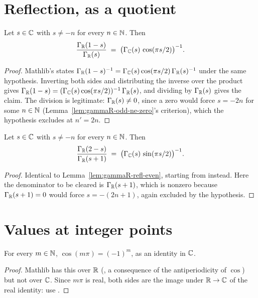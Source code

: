 \section{Reflection, as a quotient}
\label{sec:gamma-reflection}

\begin{lemma}
  \label{lem:gammaR-refl-even}
  \leanok
  Let $s \in \mathbb{C}$ with $s \neq -n$ for every $n \in \mathbb{N}$. Then
  \[ \frac{\Gamma_{\mathbb{R}}(1-s)}{\Gamma_{\mathbb{R}}(s)} \;=\;
     \bigl(\Gamma_{\mathbb{C}}(s)\,\cos(\pi s/2)\bigr)^{-1}. \]
\end{lemma}
\begin{proof}
  \leanok
  Mathlib's  states
  $\Gamma_{\mathbb{R}}(1-s)^{-1} = \Gamma_{\mathbb{C}}(s)\cos(\pi s/2)\,\Gamma_{\mathbb{R}}(s)^{-1}$ under the same
  hypothesis. Inverting both sides and distributing the inverse over the product gives
  $\Gamma_{\mathbb{R}}(1-s) = (\Gamma_{\mathbb{C}}(s)\cos(\pi s/2))^{-1}\,\Gamma_{\mathbb{R}}(s)$, and dividing by
  $\Gamma_{\mathbb{R}}(s)$ gives the claim. The division is legitimate:
  $\Gamma_{\mathbb{R}}(s) \neq 0$, since a zero would force $s = -2n$ for some $n \in \mathbb{N}$
  (Lemma~\ref{lem:gammaR-odd-ne-zero}'s criterion), which the hypothesis excludes at $n' = 2n$.
\end{proof}

\begin{lemma}
  \label{lem:gammaR-refl-odd}
  \leanok
  Let $s \in \mathbb{C}$ with $s \neq -n$ for every $n \in \mathbb{N}$. Then
  \[ \frac{\Gamma_{\mathbb{R}}(2-s)}{\Gamma_{\mathbb{R}}(s+1)} \;=\;
     \bigl(\Gamma_{\mathbb{C}}(s)\,\sin(\pi s/2)\bigr)^{-1}. \]
\end{lemma}
\begin{proof}
  \leanok
  Identical to Lemma~\ref{lem:gammaR-refl-even}, starting from
   instead. Here the denominator to be cleared is
  $\Gamma_{\mathbb{R}}(s+1)$, which is nonzero because $\Gamma_{\mathbb{R}}(s+1) = 0$ would force
  $s = -(2n+1)$, again excluded by the hypothesis.
\end{proof}

\section{Values at integer points}
\label{sec:gamma-values}

\begin{lemma}
  \label{lem:cos-natCast-mul-pi}
  \leanok
  For every $m \in \mathbb{N}$, $\cos(m\pi) = (-1)^{m}$, as an identity in $\mathbb{C}$.
\end{lemma}
\begin{proof}
  \leanok
  Mathlib has this over $\mathbb{R}$ (, a consequence of the
  antiperiodicity of $\cos$) but not over $\mathbb{C}$. Since $m\pi$ is real, both sides are the
  image under $\mathbb{R} \to \mathbb{C}$ of the real identity: use .
\end{proof}

